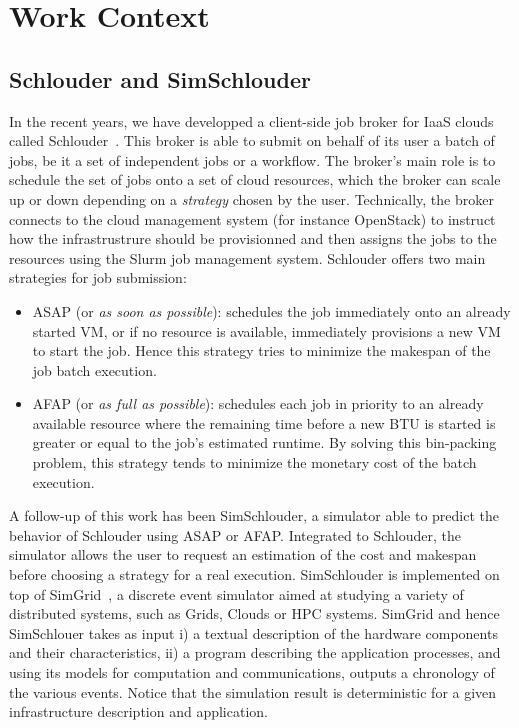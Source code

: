 \documentclass[10pt,conference,compsocconf]{IEEEtran}
\begin{document}
\section{Work Context}

\subsection{Schlouder and SimSchlouder}
In the recent years, we have developped a client-side job broker for IaaS clouds
called Schlouder~\cite{Michon17}. This broker is able to submit on behalf of its
user a  batch of  jobs, be  it a  set of  independent jobs  or a  workflow.  The
broker's main role is to schedule the set of jobs onto a set of cloud resources,
which the broker can  scale up or down depending on  a \emph{strategy} chosen by
the user.  Technically, the broker connects  to the cloud management system (for
instance OpenStack) to  instruct how the infrastrustrure  should be provisionned
and  then assigns  the jobs  to  the resources  using the  Slurm job  management
system.  Schlouder offers two main strategies for job submission:
\begin{itemize}
\item ASAP (or \textit{as soon as possible}): schedules the job immediately onto
  an already started VM, or if  no resource is available, immediately provisions
  a new VM to start the job.  Hence this strategy tries to minimize the makespan
  of the job batch execution.

\item AFAP (or \textit{as full as  possible}): schedules each job in priority to
  an already  available resource where  the remaining time  before a new  BTU is
  started is greater or equal to the job's estimated runtime. By solving this 
 bin-packing problem, this strategy tends to minimize the monetary cost of the
 batch execution.
\end{itemize}

A follow-up of this work has been  SimSchlouder, a simulator able to predict the
behavior of Schlouder using ASAP or AFAP. Integrated to Schlouder, the simulator
allows  the user  to  request an  estimation  of the  cost  and makespan  before
choosing a strategy for a real execution.  SimSchlouder is implemented on top of
SimGrid~\cite{simgrid}, a discrete  event simulator aimed at  studying a variety
of distributed systems, such as Grids,  Clouds or HPC systems. SimGrid and hence
SimSchlouer takes as  input i) a textual description of  the hardware components
and their characteristics,  ii) a program describing  the application processes,
and using its models for computation and communications, outputs a chronology of
the various  events. Notice that  the simulation  result is deterministic  for a
given infrastructure description and application.
\end{document}
